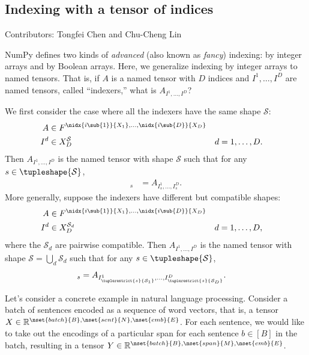 \subsection{Indexing with a tensor of indices}

Contributors: Tongfei Chen and Chu-Cheng Lin

NumPy defines two kinds of \emph{advanced} (also known as \emph{fancy}) indexing: by integer arrays and by Boolean arrays. Here, we generalize indexing by integer arrays to named tensors. That is, if $A$ is a named tensor with $D$ indices and $I^1, \ldots, I^D$ are named tensors, called ``indexers,'' what is $A_{I^1, \ldots, I^D}$?

We first consider the case where all the indexers have the same shape $\mathcal{S}$:
\begin{align*}
  A &\in F^{\nidx{i\sub{1}}{X_1}, \ldots, \nidx{i\sub{D}}{X_D}} \\
  I^d &\in X_D^{\mathcal{S}} & d &= 1, \ldots, D.
\end{align*}
Then $A_{I^1, \ldots, I^D}$ is the named tensor with shape $\mathcal{S}$ such that for any $s \in \tupleshape{\mathcal{S}}$,
\begin{align*}
  [A_{I^1, \ldots, I^D}]_s &= A_{I^1_s, \ldots, I^D_s}.
\end{align*}
More generally, suppose the indexers have different but compatible shapes:
\begin{align*}
  A &\in F^{\nidx{i\sub{1}}{X_1}, \ldots, \nidx{i\sub{D}}{X_D}} \\
  I^d &\in X_D^{\mathcal{S}_d} & d &= 1, \ldots, D,
\end{align*}
where the $\mathcal{S}_d$ are pairwise compatible. Then $A_{I^1, \ldots, I^D}$ is the named tensor with shape $\mathcal{S} = \bigcup_d \mathcal{S}_d$ such that for any $s \in \tupleshape{\mathcal{S}}$,
\begin{align*}
  [A_{I^1, \ldots, I^D}]_s &= A_{I^1_{\tuplerestrict{s}{\mathcal{S}_1}}, \ldots, I^D_{\tuplerestrict{s}{\mathcal{S}_D}}}.
\end{align*}

Let's consider a concrete example in natural language processing. Consider a batch of sentences encoded as a sequence of word vectors, that is, a tensor $X \in \mathbb{R}^{\nset{batch}{B}, \nset{sent}{N}, \nset{emb}{E}}$. For each sentence, we would like to take out the encodings of a particular span for each sentence $b \in [B]$ in the batch, resulting in a tensor $Y \in \mathbb{R}^{\nset{batch}{B}, \nset{span}{M}, \nset{emb}{E}}$.

